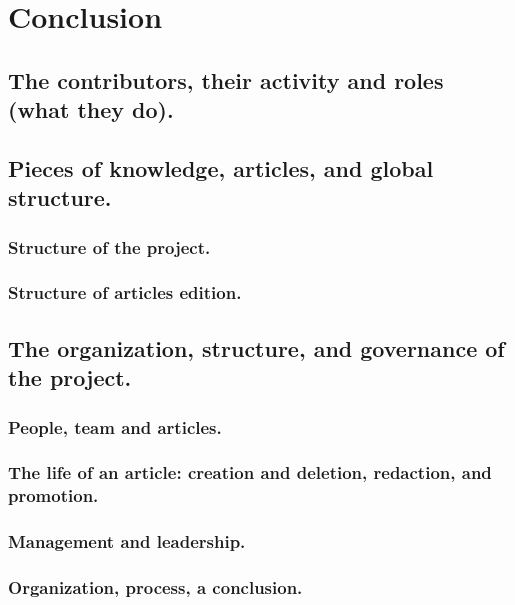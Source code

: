 \documentclass{informs3}
\begin{document}
\section{Conclusion}\label{sec:conclusion}

\subsection{The contributors, their activity and roles (what they do).}\label{subsec:The-contributors,-activity}


\subsection{Pieces of knowledge, articles, and global structure.}\label{subsec:The-pieces-of-knowledge}


\subsubsection{Structure of the project.}

\subsubsection{Structure of articles edition.}


\subsection{The organization, structure, and governance of the project.}


\subsubsection{People, team and articles.}

\subsubsection{The life of an article: creation and deletion, redaction, and promotion.}


\subsubsection{Management and leadership.}


\subsubsection{Organization, process, a conclusion.}

\end{document}
